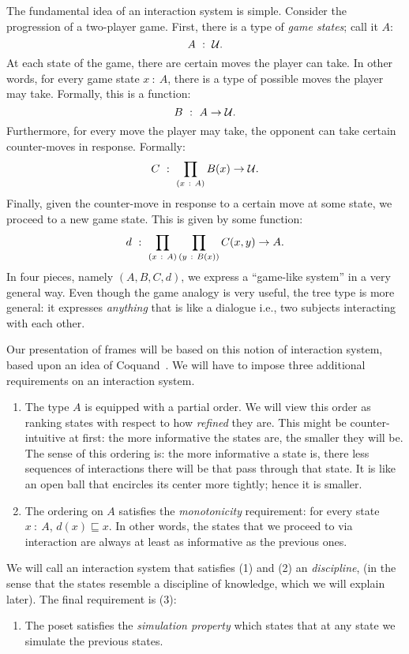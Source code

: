 The fundamental idea of an interaction system is simple. Consider the progression of a
two-player game. First, there is a type of \emph{game states}; call it $A$:
\begin{equation*}
  A~:~\mathcal{U}.
\end{equation*}
At each state of the game, there are certain moves the player can take. In other words,
for every game state $x~:~A$, there is a type of possible moves the player may take.
Formally, this is a function:
\begin{equation*}
  B~:~A \rightarrow \mathcal{U}.
\end{equation*}
Furthermore, for every move the player may take, the opponent can take certain
counter-moves in response. Formally:
\begin{equation*}
  C~:~\prod_{(x~:~A)} B(x) \rightarrow \mathcal{U}.
\end{equation*}
Finally, given the counter-move in response to a certain move at some state, we proceed to
a new game state. This is given by some function:
\begin{equation*}
  d~:~\prod_{(x~:~A)} \prod_{(y~:~B(x))} C(x, y) \rightarrow A.
\end{equation*}
In four pieces, namely $(A, B, C, d)$, we express a ``game-like system'' in a very general
way. Even though the game analogy is very useful, the tree type is more general: it
expresses \emph{anything} that is like a dialogue i.e., two subjects interacting with each
other.

Our presentation of frames will be based on this notion of interaction system, based upon
an idea of Coquand~\cite{coq-posets}. We will have to impose three additional requirements
on an interaction system.
\begin{enumerate}
  \item The type $A$ is equipped with a partial order. We will view this order as ranking
    states with respect to how \emph{refined} they are. This might be counter-intuitive at
    first: the more informative the states are, the smaller they will be. The sense of
    this ordering is: the more informative a state is, there less sequences of
    interactions there will be that pass through that state. It is like an open ball that
    encircles its center more tightly; hence it is smaller.
  \item The ordering on $A$ satisfies the \emph{monotonicity} requirement: for every state
    $x~:~A$, $d(x) \sqsubseteq x$. In other words, the states that we proceed to via interaction are
    always at least as informative as the previous ones.
\end{enumerate}
We will call an interaction system that satisfies (1) and (2) an \emph{discipline}, (in the
sense that the states resemble a discipline of knowledge, which we will explain later).
The final requirement is (3):
\begin{enumerate}
  \item The poset satisfies the \emph{simulation property} which states that at any state
    we simulate the previous states.
\end{enumerate}

